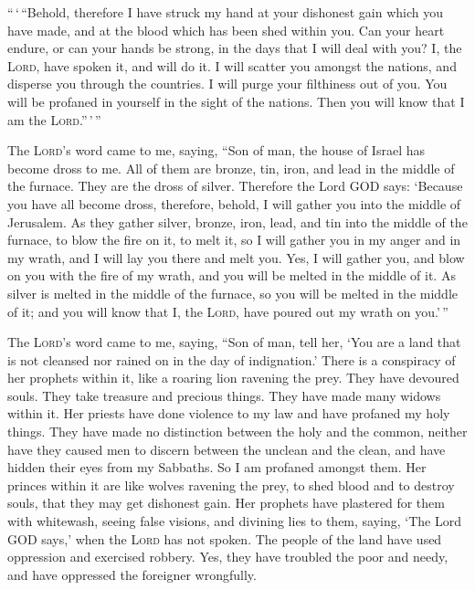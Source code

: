  ``\,`\,``Behold, therefore I have struck my hand at your
dishonest gain which you have made, and at the blood which has been shed
within you.  Can your heart endure, or can your hands be
strong, in the days that I will deal with you? I, the \textsc{Lord},
have spoken it, and will do it.  I will scatter you
amongst the nations, and disperse you through the countries. I will
purge your filthiness out of you.  You will be profaned
in yourself in the sight of the nations. Then you will know that I am
the \textsc{Lord}.''\,'\,''

 The \textsc{Lord}'s word came to me, saying,
 ``Son of man, the house of Israel has become dross to
me. All of them are bronze, tin, iron, and lead in the middle of the
furnace. They are the dross of silver.  Therefore the
Lord GOD says: `Because you have all become dross, therefore, behold, I
will gather you into the middle of Jerusalem.  As they
gather silver, bronze, iron, lead, and tin into the middle of the
furnace, to blow the fire on it, to melt it, so I will gather you in my
anger and in my wrath, and I will lay you there and melt you.
 Yes, I will gather you, and blow on you with the fire of
my wrath, and you will be melted in the middle of it.  As
silver is melted in the middle of the furnace, so you will be melted in
the middle of it; and you will know that I, the \textsc{Lord}, have
poured out my wrath on you.'\,''

 The \textsc{Lord}'s word came to me, saying,
 ``Son of man, tell her, `You are a land that is not
cleansed nor rained on in the day of indignation.'  There
is a conspiracy of her prophets within it, like a roaring lion ravening
the prey. They have devoured souls. They take treasure and precious
things. They have made many widows within it.  Her
priests have done violence to my law and have profaned my holy things.
They have made no distinction between the holy and the common, neither
have they caused men to discern between the unclean and the clean, and
have hidden their eyes from my Sabbaths. So I am profaned amongst them.
 Her princes within it are like wolves ravening the prey,
to shed blood and to destroy souls, that they may get dishonest gain.
 Her prophets have plastered for them with whitewash,
seeing false visions, and divining lies to them, saying, `The Lord GOD
says,' when the \textsc{Lord} has not spoken.  The people
of the land have used oppression and exercised robbery. Yes, they have
troubled the poor and needy, and have oppressed the foreigner
wrongfully.

